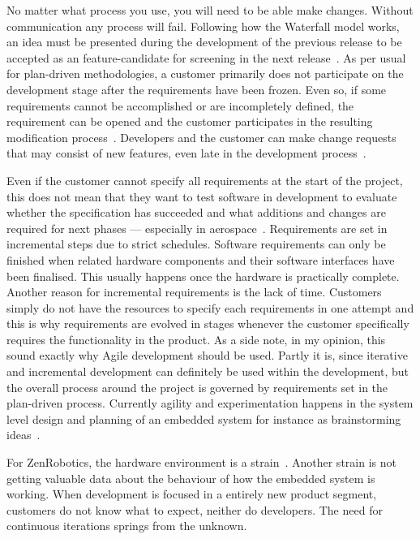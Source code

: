 \documentclass[english]{tktltiki2}
\begin{document}
No matter what process you use, you will need to be able make changes. Without communication any process will fail. Following how the Waterfall model works, an idea must be presented during the development of the previous release to be accepted as an feature-candidate for screening in the next release~\cite{Koi15}. As per usual for plan-driven methodologies, a customer primarily does not participate on the development stage after the requirements have been frozen. Even so, if some requirements cannot be accomplished or are incompletely defined, the requirement can be opened and the customer participates in the resulting modification process~\cite{Hol15b, Koi15}. Developers and the customer can make change requests that may consist of new features, even late in the development process~\cite{Hol15b, Koi15}.

Even if the customer cannot specify all requirements at the start of the project, this does not mean that they want to test software in development to evaluate whether the specification has succeeded and what additions and changes are required for next phases — especially in aerospace~\cite{Hol15b}. Requirements are set in incremental steps due to strict schedules. Software requirements can only be finished when related hardware components and their software interfaces have been finalised. This usually happens once the hardware is practically complete. Another reason for incremental requirements is the lack of time. Customers simply do not have the resources to specify each requirements in one attempt and this is why requirements are evolved in stages whenever the customer specifically requires the functionality in the product. As a side note, in my opinion, this sound exactly why Agile development should be used. Partly it is, since iterative and incremental development can definitely be used within the development, but the overall process around the project is governed by requirements set in the plan-driven process. Currently agility and experimentation happens in the system level design and planning of an embedded system for instance as brainstorming ideas~\cite{Hol15b}.

For ZenRobotics, the hardware environment is a strain~\cite{Hol15a}. Another strain is not getting valuable data about the behaviour of how the embedded system is working. When development is focused in a entirely new product segment, customers do not know what to expect, neither do developers. The need for continuous iterations springs from the unknown.
\end{document}
